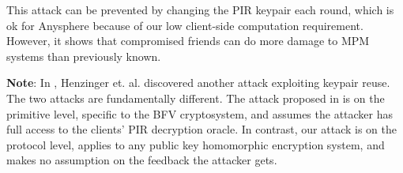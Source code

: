 This attack can be prevented by changing the PIR keypair each round, which is ok for Anysphere because of our low client-side computation requirement. However, it shows that compromised friends can do more damage to MPM systems than previously known.

\textbf{Note}: In \cite{henry2022simplepir}, Henzinger et. al. discovered another attack exploiting keypair reuse. The two attacks are fundamentally different. The attack proposed in \cite{henry2022simplepir} is on the primitive level, specific to the BFV cryptosystem, and assumes the attacker has full access to the clients' PIR decryption oracle. In contrast, our attack is on the protocol level, applies to any public key homomorphic encryption system, and makes no assumption on the feedback the attacker gets.

